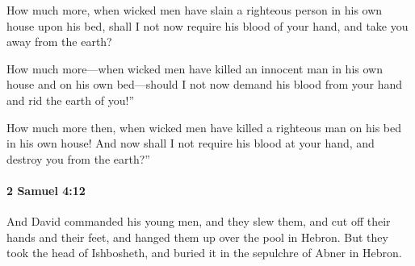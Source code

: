 			\begin{versebox}
					\item[BHS] 
					\item[ASV] How much more, when wicked men have slain a righteous person in his own house upon his bed, shall I not now require his blood of your hand, and take you away from the earth?
					\item[NIV] How much more—when wicked men have killed an innocent man in his own house and on his own bed—should I not now demand his blood from your hand and rid the earth of you!”
					\item[NRSV] How much more then, when wicked men have killed a righteous man on his bed in his own house! And now shall I not require his blood at your hand, and destroy you from the earth?”
			\end{versebox}

		\paragraph{2 Samuel 4:12} %
			\label{2SAMUEL-4-12}

			And David commanded his young men, and they slew them, and cut off their hands and their feet, and hanged them up over the pool in Hebron. But they took the head of Ishbosheth, and buried it in the sepulchre of Abner in Hebron.

